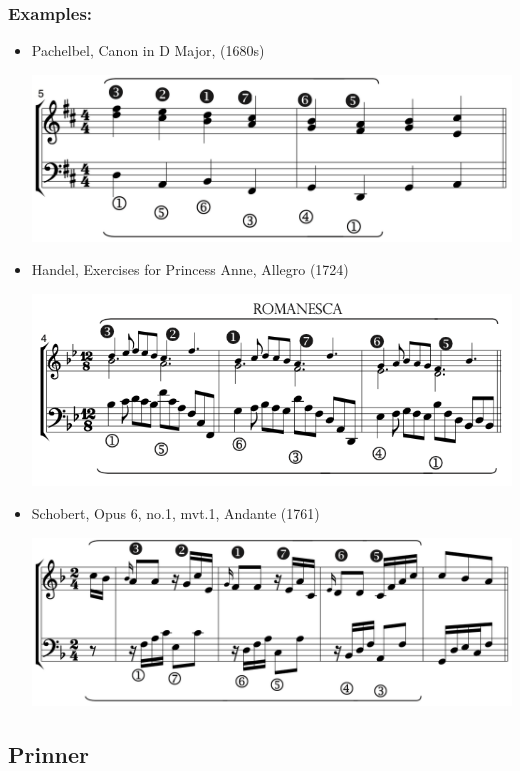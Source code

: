 ﻿\documentclass[11pt, openany]{article}
\begin{document}
\begin{itemize}
\subsubsection{Examples:}
\begin{itemize}
\item Pachelbel, Canon in D Major, (1680s)
\begin{center}
\includegraphics[scale=0.5]{pachelbelcanon.png}
\end{center}
\item Handel, Exercises for Princess Anne, Allegro (1724)
\begin{center}
\includegraphics[scale=0.5]{handelanne.png}
\end{center}
\item Schobert, Opus 6, no.1, mvt.1, Andante (1761)
\begin{center}
\includegraphics[scale=0.5]{schobert6.png}
\end{center}
\end{itemize}


	\subsection{Prinner}
	

\end{itemize}
\end{document}
